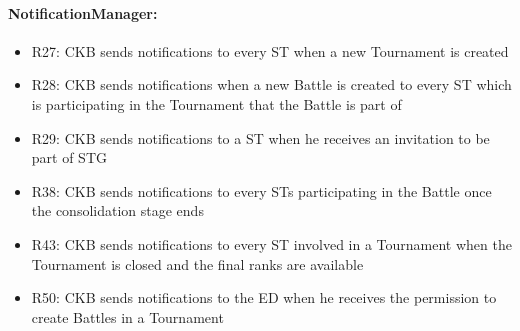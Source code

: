 \paragraph{NotificationManager:}
\begin{itemize}
    \item R27: CKB sends notifications to every ST when a new Tournament is created 
    \item R28: CKB sends notifications when a new Battle is created to every ST which is participating in the Tournament that the Battle is part of
    \item R29: CKB sends notifications to a ST when he receives an invitation to be part of STG
    \item R38: CKB sends notifications to every STs participating in the Battle once the consolidation stage ends
    \item R43: CKB sends notifications to every ST involved in a Tournament when the Tournament is closed and the final ranks are available
    \item R50: CKB sends notifications to the ED when he receives the permission to create Battles in a Tournament

\end{itemize}

